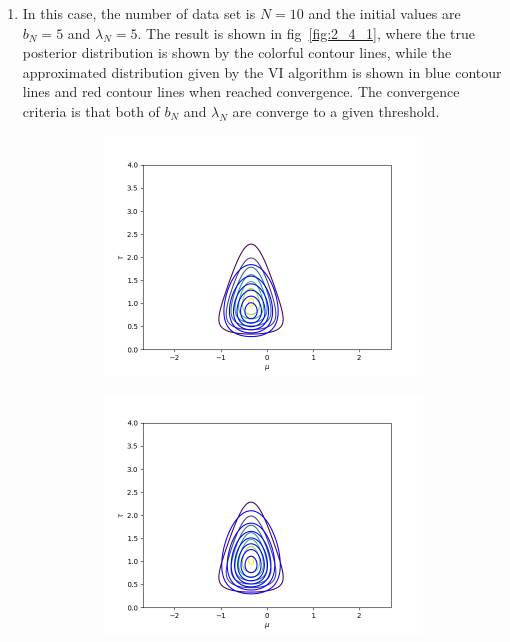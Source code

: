 \documentclass[11pt]{extarticle}
\newcommand{\0}{\mathbf{0}}
\renewcommand{\(}{\left(}
\renewcommand{\)}{\right)}
\theoremstyle{definition}
\begin{document}
\begin{enumerate}
	\item In this case, the number of data set is $N = 10$ and the initial values are $b_{N} = 5$ and $\lambda_{N} = 5$. The result is shown in fig~\ref{fig:2_4_1}, where the true posterior distribution is shown by the colorful contour lines, while the approximated distribution given by the VI algorithm is shown in blue contour lines and red contour lines when reached convergence. The convergence criteria is that both of $b_{N}$ and $\lambda_{N}$ are converge to a given threshold.
	\begin{figure}[!ht]
		\centering
		\begin{subfigure}{.4\textwidth}
			\centering
			\includegraphics[width=\linewidth]{2_4_1_1}
		\end{subfigure}
		\begin{subfigure}{.4\textwidth}
			\centering
			\includegraphics[width=\linewidth]{2_4_1_2}

\end{subfigure}
\end{figure}
\end{enumerate}
\end{document}
